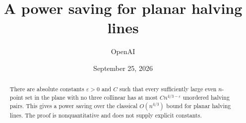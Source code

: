 \documentclass[11pt]{article}
\title{A power saving for planar halving lines}
\author{OpenAI}
\date{September 25, 2026}
\theoremstyle{definition}
\theoremstyle{remark}
\numberwithin{equation}{section}
\begin{document}
\maketitle
\begin{abstract}
There are absolute constants $\varepsilon>0$ and $C$ such that every
sufficiently large even $n$-point set in the plane with no three collinear
has at most $Cn^{4/3-\varepsilon}$ unordered halving pairs. This gives a
power saving over the classical $O(n^{4/3})$ bound for planar halving lines.
The proof is nonquantitative and does not supply explicit constants.
\end{abstract}
\tableofcontents
\clearpage








\begingroup
\raggedright


\endgroup
\end{document}

